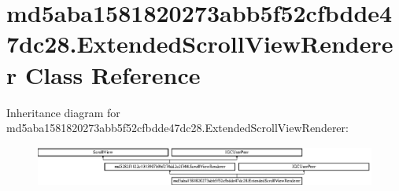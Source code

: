 \hypertarget{classmd5aba1581820273abb5f52cfbdde47dc28_1_1ExtendedScrollViewRenderer}{}\section{md5aba1581820273abb5f52cfbdde47dc28.\+Extended\+Scroll\+View\+Renderer Class Reference}
\label{classmd5aba1581820273abb5f52cfbdde47dc28_1_1ExtendedScrollViewRenderer}
Inheritance diagram for md5aba1581820273abb5f52cfbdde47dc28.\+Extended\+Scroll\+View\+Renderer\+:\begin{figure}[H]
\begin{center}
\leavevmode
\includegraphics[height=1.299304cm]{classmd5aba1581820273abb5f52cfbdde47dc28_1_1ExtendedScrollViewRenderer}
\end{center}
\end{figure}

